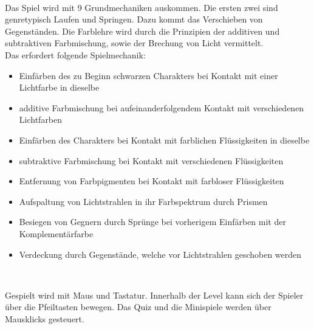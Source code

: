 \documentclass[10pt,a4paper,notitlepage]{report}
\begin{document}
	\\\par\medskip\Text
	Das Spiel wird mit 9 Grundmechaniken auskommen. Die ersten zwei sind genretypisch Laufen und Springen. Dazu kommt das Verschieben von Gegenständen. Die Farblehre wird durch die Prinzipien der additiven und subtraktiven Farbmischung, sowie der Brechung von Licht vermittelt.\\
	Das erfordert folgende Spielmechanik:\\
	\begin{itemize}
	\item Einfärben des zu Beginn schwarzen Charakters bei Kontakt mit einer Lichtfarbe in dieselbe
	\item additive Farbmischung bei aufeinanderfolgendem Kontakt mit verschiedenen Lichtfarben
	\item Einfärben des Charakters bei Kontakt mit farblichen Flüssigkeiten in dieselbe
	\item subtraktive Farbmischung bei Kontakt mit verschiedenen Flüssigkeiten
	\item Entfernung von Farbpigmenten bei Kontakt mit farbloser Flüssigkeiten
	\item Aufspaltung von Lichtstrahlen in ihr Farbspektrum durch Prismen
	\item Besiegen von Gegnern durch Sprünge bei vorherigem Einfärben mit der Komplementärfarbe
	\item Verdeckung durch Gegenstände, welche vor Lichtstrahlen geschoben werden
	\end{itemize}
	\par\smallskip
	
	\clearpage
	\marginpar{\vspace{3.0mm} \color{orange}\rule{0.8mm}{53.3mm} \\[3mm] \color{hellorange}\rule{0.8mm}{170mm}}
	\par\bigskip
	
	\\\par\medskip\Text
	Gespielt wird mit Maus und Tastatur.
	Innerhalb der Level kann sich der Spieler über die Pfeiltasten bewegen. Das Quiz und die Minispiele werden über Mausklicks gesteuert.\\\par\smallskip
	
\end{document}
